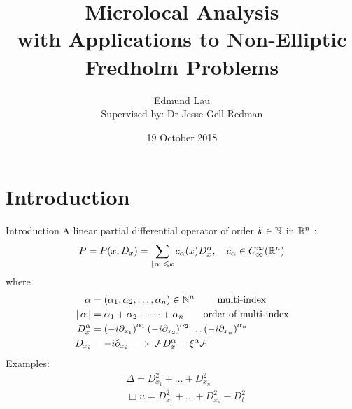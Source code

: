 \documentclass{beamer}
\title{Microlocal Analysis \\ 
    \large with Applications to Non-Elliptic Fredholm Problems}
\author{Edmund Lau \\
Supervised by: Dr Jesse Gell-Redman}
\institute[Unimelb] {
    The University of Melbourne \\ %
    \medskip
    \textit{elau1@student.unimelb.edu.au} %
}
\date{19 October 2018}
\begin{document}
    
\begin{frame}
\titlepage 
\end{frame}






\section{Introduction} 
\begin{frame}{Introduction}
A linear partial differential operator of order $k \in {\ensuremath {\mathbb N}}$ in ${\mathbb R}^n$ : 
\begin{equation*}
P = P(x, D_x) = \sum_{\left|\, \alpha\,\right| \leqslant k} c_\alpha(x) D^\alpha_x , \quad c_\alpha \in C^\infty_\infty({\mathbb R}^n)
\end{equation*}
where 
\begin{align*}
\alpha &= (\alpha_1, \alpha_2, \dots, \alpha_n) \in {\ensuremath {\mathbb N}}^n \tag*{ multi-index } \\
\left|\, \alpha\,\right| &= \alpha_1 + \alpha_2 + \dots + \alpha_n \tag*{order of multi-index} \\
D_x^\alpha & = \left(-i \partial_{x_1}\right)^{\alpha_1}\left(-i \partial_{x_2}\right)^{\alpha_2} \dots \left(-i \partial_{x_n}\right)^{\alpha_n} \\
D_{x_i} &= -i \partial_{x_i} \implies {\ensuremath {\cal F}} D_{x}^\alpha = \xi^\alpha {\ensuremath {\cal F}} 
\end{align*}
Examples: 
\begin{align*}
&\Delta = D_{x_1}^2  + \dots + D_{x_n}^2  \tag*{Laplace operator} \\
&\Box u = D_{x_1}^2  + \dots + D_{x_n}^2 - D_{t}^2    \tag*{Wave operator} 
\end{align*}
\end{frame} 
\end{document}
